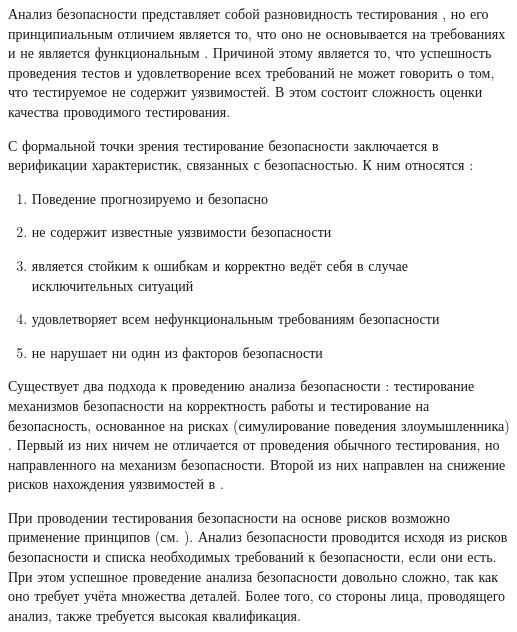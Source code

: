 %
Анализ безопасности  представляет собой разновидность тестирования 
, но его принципиальным отличием является то, что оно не основывается на 
требованиях и не является функциональным . 
%
Причиной этому является то, что успешность проведения тестов и удовлетворение всех требований 
не может говорить о том, что тестируемое  не содержит уязвимостей. 
%
В этом состоит сложность оценки качества проводимого тестирования. 

%
С формальной точки зрения тестирование безопасности  заключается 
в верификации характеристик, связанных с безопасностью. 
%
К ним относятся :
\begin{enumerate}
	\setlength{\itemsep}{0pt}%

	\item Поведение  прогнозируемо и безопасно
	\item {} не содержит известные уязвимости безопасности
	\item {} является стойким к ошибкам и корректно ведёт себя в случае 
		исключительных ситуаций
	\item {} удовлетворяет всем нефункциональным требованиям безопасности
	\item {} не нарушает ни один из факторов безопасности
\end{enumerate}

%
Существует два подхода к проведению анализа безопасности : тестирование 
механизмов безопасности на корректность работы и тестирование  
на безопасность, основанное на рисках (симулирование поведения злоумышленника) 
. 
%
Первый из них ничем не отличается от проведения обычного тестирования, но направленного на механизм 
безопасности. 
%
Второй из них направлен на снижение рисков нахождения уязвимостей в .

%
При проводении тестирования безопасности  на основе рисков возможно 
применение принципов \CIATriad (см. ). 
%
Анализ безопасности проводится исходя из рисков безопасности и списка необходимых требований 
к безопасности, если они есть. 
%
При этом успешное проведение анализа безопасности довольно сложно, так как оно требует учёта 
множества деталей. 
%
Более того, со стороны лица, проводящего анализ, также требуется высокая квалификация.


